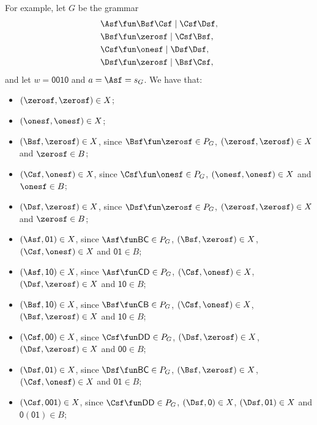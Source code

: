 For example, let $G$ be the grammar
\begin{align*}
\Asf &\fun \Bsf\Csf\mid \Csf\Dsf , \\
\Bsf &\fun \zerosf\mid \Csf\Bsf , \\
\Csf &\fun \onesf\mid \Dsf\Dsf , \\
\Dsf &\fun \zerosf\mid \Bsf\Csf ,
\end{align*}
and let $w=\mathsf{0010}$ and $a=\Asf=s_G$.
We have that:
\begin{itemize}
\item $(\zerosf,\zerosf)\in X$;

\item $(\onesf, \onesf)\in X$;

\item $(\Bsf,\zerosf)\in X$, since $\Bsf\fun\zerosf\in P_G$,
$(\zerosf,\zerosf)\in X$ and $\zerosf\in B$;

\item $(\Csf,\onesf)\in X$, since $\Csf\fun\onesf\in P_G$,
$(\onesf,\onesf)\in X$ and $\onesf\in B$;

\item $(\Dsf,\zerosf)\in X$, since $\Dsf\fun\zerosf\in P_G$,
$(\zerosf,\zerosf)\in X$ and $\zerosf\in B$;

\item $(\Asf,\mathsf{01})\in X$, since $\Asf\fun\mathsf{BC}\in P_G$,
$(\Bsf,\zerosf)\in X$, $(\Csf,\onesf)\in X$ and
$\mathsf{01}\in B$;

\item $(\Asf,\mathsf{10})\in X$, since $\Asf\fun\mathsf{CD}\in P_G$,
$(\Csf,\onesf)\in X$, $(\Dsf,\zerosf)\in X$ and $\mathsf{10}\in B$;

\item $(\Bsf,\mathsf{10})\in X$, since $\Bsf\fun\mathsf{CB}\in P_G$,
$(\Csf,\onesf)\in X$, $(\Bsf,\zerosf)\in X$ and $\mathsf{10}\in B$;

\item $(\Csf,\mathsf{00})\in X$, since $\Csf\fun\mathsf{DD}\in P_G$,
$(\Dsf,\zerosf)\in X$, $(\Dsf,\zerosf)\in X$ and $\mathsf{00}\in B$;

\item $(\Dsf,\mathsf{01})\in X$, since $\Dsf\fun\mathsf{BC}\in P_G$,
$(\Bsf,\zerosf)\in X$, $(\Csf,\onesf)\in X$ and $\mathsf{01}\in B$;

\item $(\Csf,\mathsf{001})\in X$, since $\Csf\fun\mathsf{DD}\in P_G$,
$(\Dsf,\mathsf{0})\in X$, $(\Dsf,\mathsf{01})\in X$ and
$\mathsf{0(01)}\in B$;


\end{itemize}
